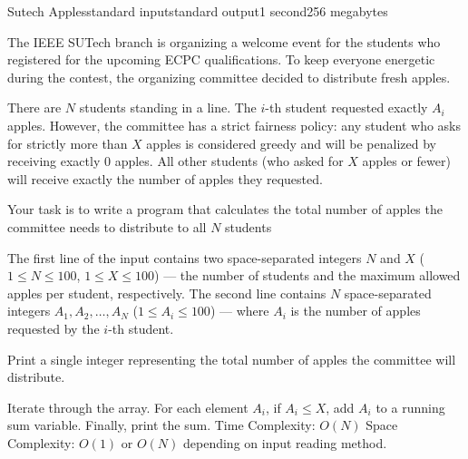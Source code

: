 \begin{problem}{Sutech Apples}{standard input}{standard output}{1 second}{256 megabytes}

The IEEE SUTech branch is organizing a welcome event for the students who registered for the upcoming ECPC qualifications. To keep everyone energetic during the contest, the organizing committee decided to distribute fresh apples.

There are $N$ students standing in a line. The $i$-th student requested exactly $A_i$ apples. However, the committee has a strict fairness policy: any student who asks for strictly more than $X$ apples is considered greedy and will be penalized by receiving exactly $0$ apples. All other students (who asked for $X$ apples or fewer) will receive exactly the number of apples they requested.

Your task is to write a program that calculates the total number of apples the committee needs to distribute to all $N$ students


\InputFile

The first line of the input contains two space-separated integers $N$ and $X$ ($1 \le N \le 100$, $1 \le X \le 100$) --- the number of students and the maximum allowed apples per student, respectively.
The second line contains $N$ space-separated integers $A_1, A_2, \dots, A_N$ ($1 \le A_i \le 100$) --- where $A_i$ is the number of apples requested by the $i$-th student.

\OutputFile
Print a single integer representing the total number of apples the committee will distribute.

\Example

\begin{example}
%
\end{example}

\Note
Iterate through the array. For each element $A_i$, if $A_i \le X$, add $A_i$ to a running sum variable. Finally, print the sum.
Time Complexity: $O(N)$
Space Complexity: $O(1)$ or $O(N)$ depending on input reading method.

\end{problem}

